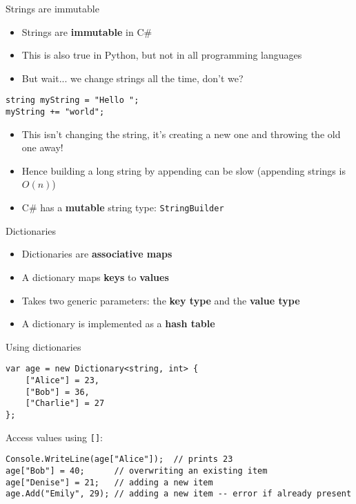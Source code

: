 \begin{frame}[fragile]{Strings are immutable}
	\begin{itemize}
		\pause\item Strings are \textbf{immutable} in C\#
        \pause\item This is also true in Python, but not in all programming languages
		\pause\item But wait... we change strings all the time, don't we?
	\end{itemize}
	\begin{lstlisting}
string myString = "Hello ";
myString += "world";
	\end{lstlisting}
	\begin{itemize}
		\pause\item This isn't changing the string, it's creating a new one and throwing the old one away!
		\pause\item Hence building a long string by appending can be slow (appending strings is $O(n)$)
		\pause\item C\# has a \textbf{mutable} string type: \lstinline{StringBuilder}
	\end{itemize}
\end{frame}

\begin{frame}{Dictionaries}
	\begin{itemize}
		\pause\item Dictionaries are \textbf{associative maps}
		\pause\item A dictionary maps \textbf{keys} to \textbf{values}
		\pause\item Takes two generic parameters: the \textbf{key type} and the \textbf{value type}
		\pause\item A dictionary is implemented as a \textbf{hash table}
	\end{itemize}		
\end{frame}

\begin{frame}[fragile]{Using dictionaries}
	\begin{lstlisting}
var age = new Dictionary<string, int> {
    ["Alice"] = 23,
    ["Bob"] = 36,
    ["Charlie"] = 27
};
	\end{lstlisting}
	\pause Access values using \lstinline{[]}:
	\begin{lstlisting}
Console.WriteLine(age["Alice"]);  // prints 23
age["Bob"] = 40;      // overwriting an existing item
age["Denise"] = 21;   // adding a new item
age.Add("Emily", 29); // adding a new item -- error if already present
	\end{lstlisting}
\end{frame}

